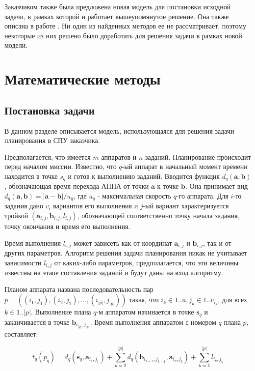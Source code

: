 \documentclass[a4paper,14pt,russian]{article}
\begin{document}
Заказчиком также была предложена новая модель для постановки исходной задачи, в рамках которой и работает вышеупомянутое решение. Она также описана в работе \cite{tuphanov1}. Ни один из найденных методов ее не рассматривает, поэтому некоторые из них решено было доработать для решения задачи в рамках новой модели.

\section{Математические методы}

\subsection{Постановка задачи}
В данном разделе описывается модель, использующаяся для решения задачи планирования в СПУ заказчика.

Предполагается, что имеется $m$ аппаратов и $n$ заданий. Планирование происходит перед началом миссии. Известно, что $q$-ый аппарат в начальный момент времени находится в точке $s_q$ и готов к выполнению заданий. Вводится функция $d_q(\mathbf{a}, \mathbf{b})$, обозначающая время перехода АНПА от точки $\mathbf{a}$ к точке $\mathbf{b}$. Она принимает вид $d_q(\mathbf{a}, \mathbf{b}) = |\mathbf{a} - \mathbf{b}| / u_q$, где $u_q$ - максимальная скорость $q$-го аппарата. Для $i$-го задания дано $v_i$ вариантов его выполнения и $j$-ый вариант характеризуется тройкой $(\mathbf{a}_{i, j}, \mathbf{b}_{i,j}, l_{i,j})$, обозначающей соответственно точку начала задания, точку окончания и время его выполнения.

Время выполнения $l_{i,j}$ может зависеть как от координат $\mathbf{a}_{i, j}$ и $\mathbf{b}_{i,j}$, так и от других параметров. Алгоритм решения задачи планирования никак не учитывает зависимости $l_{i,j}$ от каких-либо параметров, предполагается, что эти величины известны на этапе составления заданий и будут даны на вход алгоритму.

Планом аппарата названа последовательность пар \\ $p = ((i_1, j_1), (i_2, j_2), ..., (i_{|p|}, j_{|p|}))$ такая, что $i_k \in 1..n, j_k \in 1..v_{i_k}$, для всех $k \in 1..|p|$. Выполнение плана $q$-м аппаратом начинается в точке $\mathbf{s}_q$ и заканчивается в точке $\mathbf{b}_{i_{|p|}, j_{|p|}}$. Время выполнения аппаратом с номером $q$ плана $p$, составляет:

\begin{equation} \label{varm1}
t_q(p_q) = d_q(\mathbf{s}_q, \mathbf{a}_{i_1, j_1}) + \sum_{k=2}^{|p|} d_q(\mathbf{b}_{i_{k-1}, j_{k - 1}}, \mathbf{a}_{i_k, j_k}) + \sum_{k=1}^{|p|}l_{i_k, j_k}
\end{equation}
\end{document}
